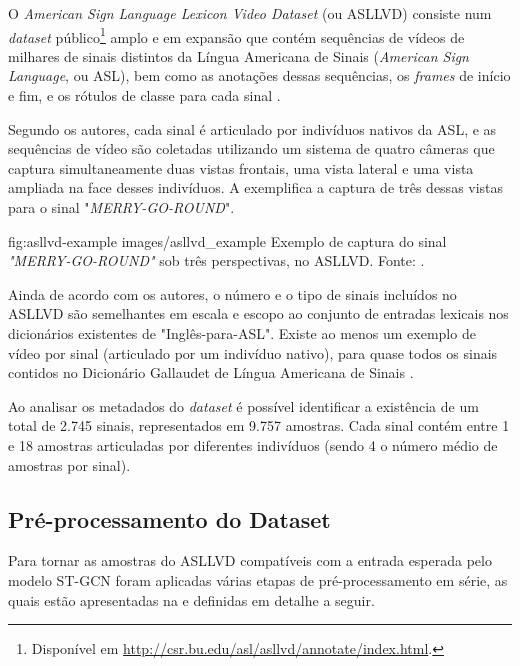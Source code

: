 O \textit{American Sign Language Lexicon Video Dataset} (ou ASLLVD) consiste num \textit{dataset} público\footnote{
    Disponível em \url{http://csr.bu.edu/asl/asllvd/annotate/index.html}.
} amplo e em expansão que contém sequências de vídeos de milhares de sinais distintos da Língua Americana de Sinais (\textit{American Sign Language}, ou ASL), bem como as anotações dessas sequências, os \textit{frames} de início e fim, e os rótulos de classe para cada sinal \cite{athitsos-asllvd-2008, neidle-2012, vloger-2012}.

Segundo os autores, cada sinal é articulado por indivíduos nativos da ASL, e as sequências de vídeo são coletadas utilizando um sistema de quatro câmeras que captura simultaneamente duas vistas frontais, uma vista lateral e uma vista ampliada na face desses indivíduos. A  exemplifica a captura de três dessas vistas para o sinal "\textit{MERRY-GO-ROUND}".

\image
    {fig:asllvd-example}
    {images/asllvd_example}
    {Exemplo de captura do sinal \textit{"MERRY-GO-ROUND"} sob três perspectivas, no ASLLVD. Fonte:  \cite[p. 2]{athitsos-asllvd-2008}.}

Ainda de acordo com os autores, o número e o tipo de sinais incluídos no ASLLVD são semelhantes em escala e escopo ao conjunto de entradas lexicais nos dicionários existentes de "Inglês-para-ASL". Existe ao menos um exemplo de vídeo por sinal (articulado por um indivíduo nativo), para quase todos os sinais contidos no Dicionário Gallaudet de Língua Americana de Sinais \cite{athitsos-asllvd-2008, gallaudet-2005}. 

Ao analisar os metadados do \textit{dataset} é possível identificar a existência de um total de 2.745 sinais, representados em 9.757 amostras. Cada sinal contém entre 1 e 18 amostras articuladas por diferentes indivíduos (sendo 4 o número médio de amostras por sinal).

\subsection{Pré-processamento do Dataset} %
\label{sec:preproc-dataset}

Para tornar as amostras do ASLLVD compatíveis com a entrada esperada pelo modelo ST-GCN foram aplicadas várias etapas de pré-processamento em série, as quais estão apresentadas na  e definidas em detalhe a seguir.

